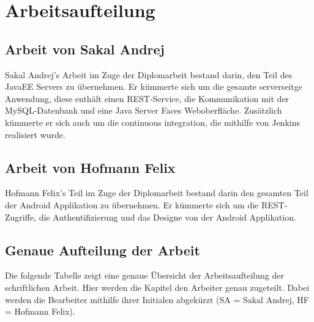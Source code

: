 \chapter{Arbeitsaufteilung}
\section{Arbeit von Sakal Andrej}
\begin{normalsize}
Sakal Andrej's Arbeit im Zuge der Diplomarbeit bestand darin, den Teil des JavaEE Servers zu übernehmen. Er kümmerte sich um die gesamte serverseitge Anwendung, diese enthält einen REST-Service, die Kommunikation mit der MySQL-Datenbank und eine Java Server Faces Weboberfläche. Zusätzlich kümmerte er sich auch um die continuous integration, die mithilfe von Jenkins realisiert wurde.
\end{normalsize}

\section{Arbeit von Hofmann Felix}
\begin{normalsize}
Hofmann Felix's Teil im Zuge der Diplomarbeit bestand darin den gesamten Teil der Android Applikation zu übernehmen. Er kümmerte sich um die REST-Zugriffe, die Authentifizierung und das Designe von der Android Applikation.
\end{normalsize}

\section{Genaue Aufteilung der Arbeit}
\begin{normalsize}
Die folgende Tabelle zeigt eine genaue Übersicht der Arbeitsaufteilung der schriftlichen Arbeit. Hier werden die Kapitel den Arbeiter genau zugeteilt. Dabei werden die Bearbeiter mithilfe ihrer Initialen abgekürzt (SA = Sakal Andrej, HF = Hofmann Felix).
\end{normalsize}

